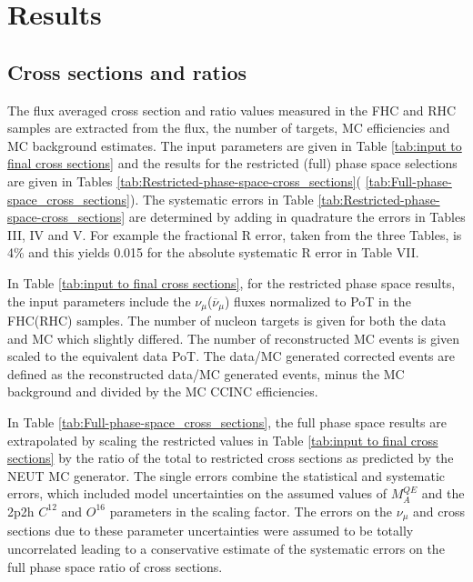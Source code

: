 \section{Results}

\subsection{Cross sections and ratios}

The flux averaged cross section and ratio values measured in the FHC
and RHC samples are extracted from the flux, the number of targets,
MC efficiencies and MC background estimates. The input parameters
are given in Table \ref{tab:input to final cross sections} and the
results for the restricted (full) phase space selections are given in
Tables \ref{tab:Restricted-phase-space-cross_sections}( \ref{tab:Full-phase-space_cross_sections}).
The systematic errors in Table \ref{tab:Restricted-phase-space-cross_sections}
are determined by adding in quadrature the errors in 
Tables III, IV and V. For example the fractional R error,
taken from the three Tables, is 4\% and this yields 0.015
for the absolute systematic R error in Table VII. 

In Table \ref{tab:input to final cross sections},
for the restricted phase space results,
the input parameters
include the $\nu_\mu$($\overline\nu_\mu$) fluxes normalized to PoT in the FHC(RHC) samples. 
The number of nucleon targets is given for both the data and MC
which slightly differed. The number of reconstructed MC events is
given scaled to the equivalent data PoT. The data/MC generated corrected
events are defined as the reconstructed data/MC generated events,
minus the MC background and divided by the MC CCINC efficiencies.

In Table \ref{tab:Full-phase-space_cross_sections}, the full phase
space results are extrapolated
by scaling the restricted values in Table \ref{tab:input to final cross sections}
by the ratio of the total to restricted cross sections as predicted by the
NEUT MC generator.  The single errors combine the
statistical and systematic errors, which included 
model uncertainties on the assumed values of
$M_A^{QE}$ and the 2p2h $C^{12}$  and $O^{16}$ parameters in the scaling factor.
The errors
on the $\nu_\mu$ and \nubar cross sections due to these parameter
uncertainties
were assumed to be totally uncorrelated leading to a conservative
estimate of the systematic errors on the full phase space
ratio of cross sections.

